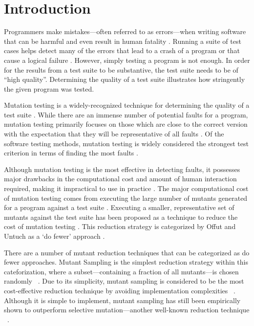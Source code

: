 \section{Introduction}
Programmers make mistakes---often referred to as errors---when writing software
that can be harmful and even result in human fatality \cite{vicente2003programming}.
Running a suite of test cases helps detect many of the errors
that lead to a crash of a program or that cause a logical failure \cite{wagner2005comparing}.
However, simply testing a program is not enough. In order for the results
from a test suite to be substantive, the test suite needs to be of ``high quality''.
Determining the quality of a test suite illustrates how stringently the given
program was tested.

Mutation testing is a widely-recognized technique for determining the quality
of a test suite \cite{gopinath2015mutation}. While there are an immense number
of potential faults for a program, mutation testing primarily focuses on those
which are close to the correct version with the expectation that they will
be representative of all faults \cite{jia2011analysis}.
Of the software testing methods, mutation testing is widely considered the strongest
test criterion in terms of finding the most faults \cite{ammann2008introduction}.

Although mutation testing is the most effective in detecting faults, it possesses
major drawbacks in the computational cost and amount of human interaction required, making it
impractical to use in practice \cite{gopinath2015mutation, wong1995reducing, gopinath2015empirical}.
The major computational cost of mutation testing comes from executing the large number of mutants generated for a
program against a test suite \cite{offutt1993experimental}. Executing a smaller, representative
set of mutants against the test suite has been proposed as a technique to reduce
the cost of mutation testing \cite{jia2011analysis, wong1995reducing, offutt1993experimental, offutt2001mutation}.
This reduction strategy is categorized by Offut and Untuch as a `do fewer' approach \cite{offutt2001mutation}.

There are a number of mutant reduction techniques that can be categorized as do fewer approaches.
Mutant Sampling is the simplest reduction strategy within this cateforization, where a subset---containing a fraction of all mutants---is
chosen randomly ~\cite{wong1995reducing}.
Due to its simplicity, mutant sampling is considered to be the most cost-effective reduction technique by avoiding implementation complexities ~\cite{gopinath2015mutation}.
Although it is simple to implement, mutant sampling has still been empirically shown to outperform selective mutation---another well-known reduction technique ~\cite{zhang2010operator}.

